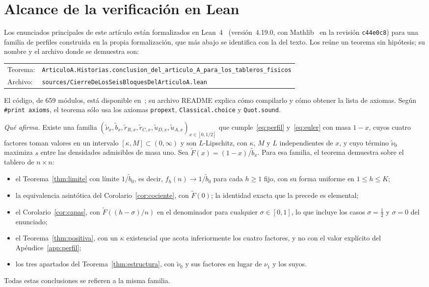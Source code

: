 \section{Alcance de la verificación en Lean}\label{sec:verificacion}

Los enunciados principales de este artículo están formalizados en Lean~4~\cite{Lean4} (versión~4.19.0,
con Mathlib~\cite{Mathlib} en la revisión \texttt{c44e0c8}) para una familia de perfiles construida en la
propia
formalización, que más abajo se identifica con la del texto. Los reúne un teorema sin
hipótesis; su nombre y el archivo donde se demuestra son:
\begin{center}\small
\begin{tabular}{@{}l@{\quad}l@{}}
Teorema: & \texttt{ArticuloA.Historias.conclusion\_del\_articulo\_A\_para\_los\_tableros\_fisicos}\\[2pt]
Archivo: & \texttt{sources/CierreDeLosSeisBloquesDelArticuloA.lean}
\end{tabular}
\end{center}
\noindent El código, de 659 módulos, está disponible
en~\cite{CodigoLean}; su archivo README explica cómo compilarlo y cómo obtener la lista de axiomas. Según
\texttt{\#print axioms}, el teorema sólo usa los axiomas
\texttt{propext}, \texttt{Classical.choice} y \texttt{Quot.sound}.

\emph{Qué afirma.} Existe una familia
$(\tilde\nu_x,\tilde b_x,\tilde r_{R,x},\tilde r_{C,x},\tilde u_{D,x},\tilde u_{A,x})_{x\in[0,1/2]}$
que cumple~\eqref{eq:perfil} y~\eqref{eq:euler} con masa $1-x$, cuyos cuatro factores toman
valores en un intervalo $[\kappa,M]\subset(0,\infty)$ y son $L$-Lipschitz, con $\kappa$, $M$ y
$L$ independientes de $x$, y cuyo término $\tilde\nu_0$ maximiza $s$ entre las densidades
admisibles de masa uno. Sea $\tilde F(x)=(1-x)/\tilde b_x$. Para esa familia, el teorema
demuestra sobre el tablero de $n\times n$:
\begin{itemize}
\item el Teorema~\ref{thm:limite} con límite $1/\tilde b_0$, es decir, $f_h(n)\to1/\tilde b_0$
para cada $h\ge1$ fijo, con su forma uniforme en $1\le h\le K$;
\item la equivalencia asintótica del Corolario~\ref{cor:cociente}, con $\tilde F(0)$; la identidad
exacta que la precede es elemental;
\item el Corolario~\ref{cor:capas}, con $\tilde F((h-\sigma)/n)$ en el denominador para cualquier
$\sigma\in[0,1]$, lo que incluye los casos $\sigma=\frac12$ y $\sigma=0$ del enunciado;
\item el Teorema~\ref{thm:positiva}, con un $\kappa$ existencial que acota inferiormente los
cuatro factores, y no con el valor explícito del Apéndice~\ref{app:perfil};
\item los tres apartados del Teorema~\ref{thm:estructura}, con $\tilde\nu_0$ y sus factores en
lugar de $\nu_1$ y los suyos.
\end{itemize}
Todas estas conclusiones se refieren a la misma familia.


